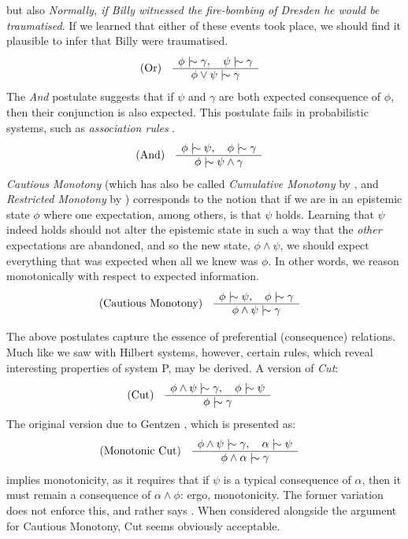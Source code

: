 but also \textit{Normally, if Billy witnessed the fire-bombing of Dresden he would be traumatised}. If we learned that
either of these events took place, we should find it plausible to infer that Billy were traumatised.
%
\begin{align}
	\inferLeft{Or}{\phi \twiddle \gamma, \quad \psi \twiddle \gamma}{\phi \lor \psi \twiddle \gamma}
\end{align}
%
The \textit{And} postulate suggests that if $\psi$ and $\gamma$ are both expected consequence of $\phi$, then their
conjunction is also expected. This postulate fails in probabilistic systems, such as \textit{association rules} \cite{gabbay1985theoreticalFoundations}.
%
\begin{align}
	\label{postulate:and}\inferLeft{And}{\phi \twiddle \psi, \quad \phi \twiddle \gamma}{\phi \twiddle \psi \land \gamma}
\end{align}
%
\textit{Cautious Monotony} (which has also be called \textit{Cumulative Monotony} by \cite{makinson2003bridges}, and
\textit{Restricted Monotony} by \cite{gabbay1985theoreticalFoundations}) corresponds to the notion that if we are in an
epistemic state $\phi$ where one expectation, among others, is that $\psi$ holds. Learning that $\psi$ indeed holds should
not alter the epistemic state in such a way that the \textit{other} expectations are abandoned, and so the new state,
$\phi \land \psi$, we should expect everything that was expected when all we knew was $\phi$. In other words, we reason monotonically
with respect to expected information.
%
\begin{align}
	\label{postulate:cm}\inferLeft{Cautious Monotony}{\phi \twiddle \psi, \quad \phi \twiddle \gamma }{\phi \land \psi \twiddle \gamma}
\end{align}

The above postulates capture the essence of preferential (consequence) relations. Much like we saw with Hilbert systems,
however, certain rules, which reveal interesting properties of system P, may be derived. A version of \textit{Cut}:
%
\begin{align}
	\label{postulate:cut}\inferLeft{Cut}{\phi \land \psi \twiddle \gamma, \quad \phi \twiddle \psi}{\phi \twiddle \gamma}
\end{align}
%
The original version due to Gentzen \cite{Ben1993Mathematical}, which is presented as:
%
\begin{align}
	\inferLeft{Monotonic Cut}{\phi \land \psi \twiddle \gamma, \quad \alpha \twiddle \psi}{\phi \land \alpha \twiddle \gamma}
\end{align}
%
implies monotonicity, as it requires that if $\psi$ is a typical consequence of $\alpha$, then it must remain a consequence
of $\alpha \land \phi$: ergo, monotonicity. The former variation does not enforce this, and rather says .
When considered alongside the argument for Cautious Monotony, Cut seems obviously acceptable.

